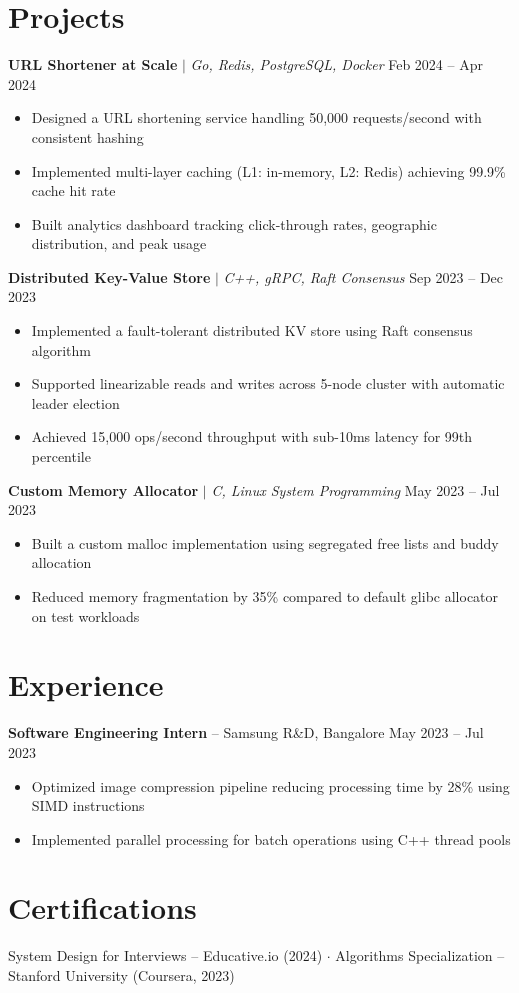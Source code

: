 \documentclass[10pt,a4paper]{article}
\begin{document}
\section{Projects}

\textbf{URL Shortener at Scale} $\mid$ \textit{Go, Redis, PostgreSQL, Docker} \hfill Feb 2024 -- Apr 2024
\begin{itemize}
    \item Designed a URL shortening service handling 50,000 requests/second with consistent hashing
    \item Implemented multi-layer caching (L1: in-memory, L2: Redis) achieving 99.9\% cache hit rate
    \item Built analytics dashboard tracking click-through rates, geographic distribution, and peak usage
\end{itemize}

\textbf{Distributed Key-Value Store} $\mid$ \textit{C++, gRPC, Raft Consensus} \hfill Sep 2023 -- Dec 2023
\begin{itemize}
    \item Implemented a fault-tolerant distributed KV store using Raft consensus algorithm
    \item Supported linearizable reads and writes across 5-node cluster with automatic leader election
    \item Achieved 15,000 ops/second throughput with sub-10ms latency for 99th percentile
\end{itemize}

\textbf{Custom Memory Allocator} $\mid$ \textit{C, Linux System Programming} \hfill May 2023 -- Jul 2023
\begin{itemize}
    \item Built a custom malloc implementation using segregated free lists and buddy allocation
    \item Reduced memory fragmentation by 35\% compared to default glibc allocator on test workloads
\end{itemize}

\section{Experience}

\textbf{Software Engineering Intern} -- Samsung R\&D, Bangalore \hfill May 2023 -- Jul 2023
\begin{itemize}
    \item Optimized image compression pipeline reducing processing time by 28\% using SIMD instructions
    \item Implemented parallel processing for batch operations using C++ thread pools
\end{itemize}

\section{Certifications}

{\small System Design for Interviews -- Educative.io (2024) $\cdot$ Algorithms Specialization -- Stanford University (Coursera, 2023)}
\end{document}
